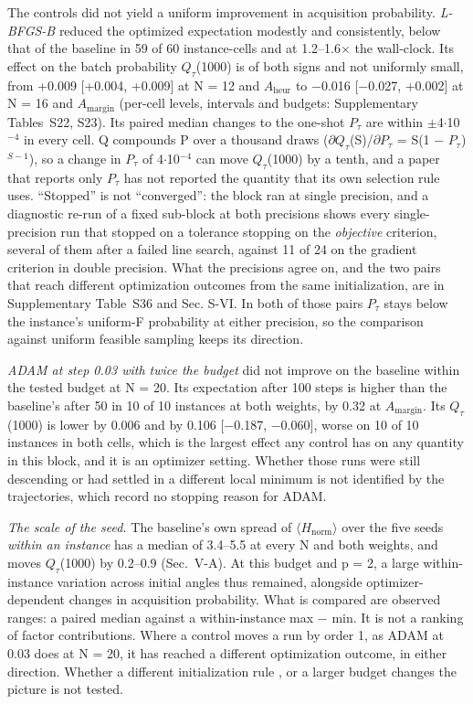 \documentclass{ieeeaccess}
\begin{document}
The controls did not yield a uniform improvement in acquisition probability. \textit{L-BFGS-B} reduced the optimized expectation modestly and consistently, below that of the baseline in 59 of 60 instance-cells and at 1.2--1.6$\times$ the wall-clock. Its effect on the batch probability $Q_{\tau}$(1000) is of both signs and not uniformly small, from +0.009 [+0.004, +0.009] at N = 12 and $A_{\mathrm{heur}}$ to $-$0.016 [$-$0.027, +0.002] at N = 16 and $A_{\mathrm{margin}}$ (per-cell levels, intervals and budgets: Supplementary Tables~S22, S23). Its paired median changes to the one-shot $P_{\tau}$ are within $\pm$4$\cdot$10$^{-4}$ in every cell. Q compounds P over a thousand draws ($\partial$$Q_{\tau}$(S)/$\partial$$P_{\tau}$ = S(1 $-$ $P_{\tau}$)$^{S-1}$), so a change in $P_{\tau}$ of 4$\cdot$10$^{-4}$ can move $Q_{\tau}$(1000) by a tenth, and a paper that reports only $P_{\tau}$ has not reported the quantity that its own selection rule uses. ``Stopped'' is not ``converged'': the block ran at single precision, and a diagnostic re-run of a fixed sub-block at both precisions shows every single-precision run that stopped on a tolerance stopping on the \textit{objective} criterion, several of them after a failed line search, against 11 of 24 on the gradient criterion in double precision. What the precisions agree on, and the two pairs that reach different optimization outcomes from the same initialization, are in Supplementary Table~S36 and Sec. S-VI. In both of those pairs $P_{\tau}$ stays below the instance's uniform-F probability at either precision, so the comparison against uniform feasible sampling keeps its direction.


\textit{ADAM at step 0.03 with twice the budget} did not improve on the baseline within the tested budget at N = 20. Its expectation after 100 steps is higher than the baseline's after 50 in 10 of 10 instances at both weights, by 0.32 at $A_{\mathrm{margin}}$. Its $Q_{\tau}$(1000) is lower by 0.006 and by 0.106 [$-$0.187, $-$0.060], worse on 10 of 10 instances in both cells, which is the largest effect any control has on any quantity in this block, and it is an optimizer setting. Whether those runs were still descending or had settled in a different local minimum is not identified by the trajectories, which record no stopping reason for ADAM.


\textit{The scale of the seed.} The baseline's own spread of $\langle$$H_{\mathrm{norm}}$$\rangle$ over the five seeds \textit{within an instance} has a median of 3.4--5.5 at every N and both weights, and moves $Q_{\tau}$(1000) by 0.2--0.9 (Sec.~V-A). At this budget and p = 2, a large within-instance variation across initial angles thus remained, alongside optimizer-dependent changes in acquisition probability. What is compared are observed ranges: a paired median against a within-instance max $-$ min. It is not a ranking of factor contributions. Where a control moves a run by order 1, as ADAM at 0.03 does at N = 20, it has reached a different optimization outcome, in either direction. Whether a different initialization rule \cite{ref32}, \cite{ref33} or a larger budget changes the picture is not tested.
\end{document}
